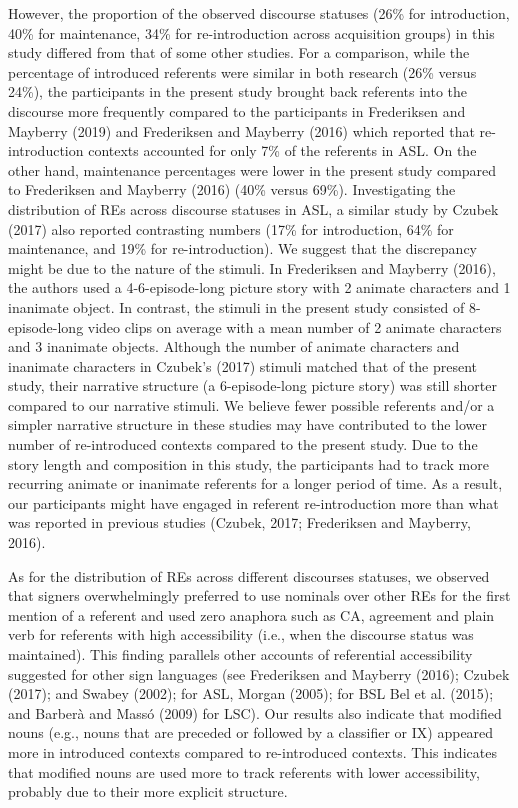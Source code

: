 \documentclass[]{elsarticle} %
\begin{document}
However, the proportion of the observed discourse statuses (26\% for
introduction, 40\% for maintenance, 34\% for re-introduction across
acquisition groups) in this study differed from that of some other
studies. For a comparison, while the percentage of introduced referents
were similar in both research (26\% versus 24\%), the participants in
the present study brought back referents into the discourse more
frequently compared to the participants in Frederiksen and Mayberry
(2019) and Frederiksen and Mayberry (2016) which reported that
re-introduction contexts accounted for only 7\% of the referents in ASL.
On the other hand, maintenance percentages were lower in the present
study compared to Frederiksen and Mayberry (2016) (40\% versus 69\%).
Investigating the distribution of REs across discourse statuses in ASL,
a similar study by Czubek (2017) also reported contrasting numbers (17\%
for introduction, 64\% for maintenance, and 19\% for re-introduction).
We suggest that the discrepancy might be due to the nature of the
stimuli. In Frederiksen and Mayberry (2016), the authors used a
4-6-episode-long picture story with 2 animate characters and 1 inanimate
object. In contrast, the stimuli in the present study consisted of
8-episode-long video clips on average with a mean number of 2 animate
characters and 3 inanimate objects. Although the number of animate
characters and inanimate characters in Czubek's (2017) stimuli matched
that of the present study, their narrative structure (a 6-episode-long
picture story) was still shorter compared to our narrative stimuli. We
believe fewer possible referents and/or a simpler narrative structure in
these studies may have contributed to the lower number of re-introduced
contexts compared to the present study. Due to the story length and
composition in this study, the participants had to track more recurring
animate or inanimate referents for a longer period of time. As a result,
our participants might have engaged in referent re-introduction more
than what was reported in previous studies (Czubek, 2017; Frederiksen
and Mayberry, 2016).

As for the distribution of REs across different discourses statuses, we
observed that signers overwhelmingly preferred to use nominals over
other REs for the first mention of a referent and used zero anaphora
such as CA, agreement and plain verb for referents with high
accessibility (i.e., when the discourse status was maintained). This
finding parallels other accounts of referential accessibility suggested
for other sign languages (see Frederiksen and Mayberry (2016); Czubek
(2017); and Swabey (2002); for ASL, Morgan (2005); for BSL Bel et al.
(2015); and Barberà and Massó (2009) for LSC). Our results also indicate
that modified nouns (e.g., nouns that are preceded or followed by a
classifier or IX) appeared more in introduced contexts compared to
re-introduced contexts. This indicates that modified nouns are used more
to track referents with lower accessibility, probably due to their more
explicit structure.
\end{document}

